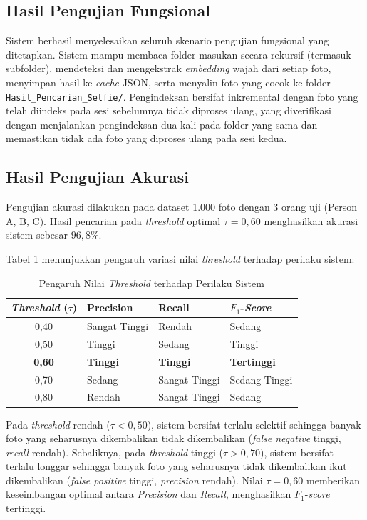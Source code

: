 \subsection{Hasil Pengujian Fungsional}

Sistem berhasil menyelesaikan seluruh skenario pengujian fungsional yang ditetapkan. Sistem mampu membaca folder masukan secara rekursif (termasuk subfolder), mendeteksi dan mengekstrak \textit{embedding} wajah dari setiap foto, menyimpan hasil ke \textit{cache} JSON, serta menyalin foto yang cocok ke folder \texttt{Hasil\_Pencarian\_Selfie/}. Pengindeksan bersifat inkremental dengan foto yang telah diindeks pada sesi sebelumnya tidak diproses ulang, yang diverifikasi dengan menjalankan pengindeksan dua kali pada folder yang sama dan memastikan tidak ada foto yang diproses ulang pada sesi kedua.

\subsection{Hasil Pengujian Akurasi}

Pengujian akurasi dilakukan pada dataset 1.000 foto dengan 3 orang uji (Person A, B, C). Hasil pencarian pada \textit{threshold} optimal $\tau = 0{,}60$ menghasilkan akurasi sistem sebesar $96{,}8\%$.

Tabel \ref{tab:hasil grid search} menunjukkan pengaruh variasi nilai \textit{threshold} terhadap perilaku sistem:

\begin{table}[H]
    \caption{Pengaruh Nilai \textit{Threshold} terhadap Perilaku Sistem}
    \label{tab:hasil grid search}
    \begin{tabularx}{\textwidth}{|c|X|X|X|}
    \hline
    \textbf{\textit{Threshold} ($\tau$)} & \textbf{Precision} & \textbf{Recall} & \textbf{$F_1$-\textit{Score}} \\ \hline
    0,40 & Sangat Tinggi & Rendah & Sedang \\ \hline
    0,50 & Tinggi & Sedang & Tinggi \\ \hline
    \textbf{0,60} & \textbf{Tinggi} & \textbf{Tinggi} & \textbf{Tertinggi} \\ \hline
    0,70 & Sedang & Sangat Tinggi & Sedang-Tinggi \\ \hline
    0,80 & Rendah & Sangat Tinggi & Sedang \\ \hline
    \end{tabularx}
\end{table}

Pada \textit{threshold} rendah ($\tau < 0{,}50$), sistem bersifat terlalu selektif sehingga banyak foto yang seharusnya dikembalikan tidak dikembalikan (\textit{false negative} tinggi, \textit{recall} rendah). Sebaliknya, pada \textit{threshold} tinggi ($\tau > 0{,}70$), sistem bersifat terlalu longgar sehingga banyak foto yang seharusnya tidak dikembalikan ikut dikembalikan (\textit{false positive} tinggi, \textit{precision} rendah). Nilai $\tau = 0{,}60$ memberikan keseimbangan optimal antara \textit{Precision} dan \textit{Recall}, menghasilkan $F_1$-\textit{score} tertinggi.

